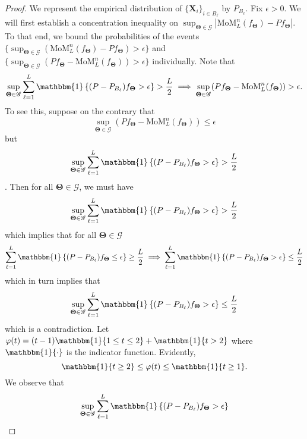 \documentclass{article}
\newcommand{\bX}{\boldsymbol{X}}
\newcommand{\bTheta}{\boldsymbol{\Theta}}
\newcommand{\cL}{\mathcal{L}}
\newcommand{\cO}{\mathcal{O}}
\newcommand{\one}{\mathbbm{1}}
\begin{document}
\begin{proof} 
We represent the empirical distribution of $\{\bX_i\}_{i \in B_\ell}$ by $P_{B_{\ell}}$. Fix $\epsilon>0$. We will first establish a concentration inequality on $\sup_{\bTheta \in \mathscr{G}} |\text{MoM}_L^n (f_{\bTheta}) - P f_{\bTheta} |$. To that end, we bound the probabilities of the events $\{\sup_{\bTheta \in \mathscr{G}}(\text{MoM}_L^n (f_{\bTheta}) - P f_{\bTheta}) >\epsilon\}$ and $\{\sup_{\bTheta \in \mathscr{G}}  ( P f_{\bTheta} - \text{MoM}_L^n (f_{\bTheta})) > \epsilon\}$ individually. Note that 
\begin{equation}
\sup_{\bTheta \in \mathscr{G}}\sum_{\ell = 1}^L \one\left\{(P-P_{B_\ell})f_{\bTheta} > \epsilon\right\} > \frac{L}{2} \implies \sup_{\bTheta \in \mathscr{G}} (P f_{\bTheta} - \text{MoM}_L^n (f_{\bTheta})) > \epsilon.
\end{equation}
To see this, suppose on the contrary that \[\sup_{\bTheta \in \mathscr{G}}  (P f_{\bTheta} - \text{MoM}_L^n (f_{\bTheta})) \le \epsilon\] but \[\sup_{\bTheta \in \mathscr{G}}\sum_{\ell = 1}^L \one\left\{(P-P_{B_\ell})f_{\bTheta} > \epsilon\right\} > \frac{L}{2}\]. 
Then for all $\bm{\Theta}\in \mathscr{G}$, we must have \[\sup_{\bTheta \in \mathscr{G}}\sum_{\ell = 1}^L \one\left\{(P-P_{B_\ell})f_{\bTheta} > \epsilon\right\} > \frac{L}{2}\] which implies that for all $\bm{\Theta}\in \mathscr{G}$ \[\sum_{\ell = 1}^L \one\left\{(P-P_{B_\ell})f_{\bTheta} \le \epsilon\right\} \ge \frac{L}{2} \implies \sum_{\ell = 1}^L \one\left\{(P-P_{B_\ell})f_{\bTheta} > \epsilon\right\} \le \frac{L}{2}\] which in turn implies that \[\sup_{\bTheta \in \mathscr{G}}\sum_{\ell = 1}^L \one\left\{(P-P_{B_\ell})f_{\bTheta} > \epsilon\right\} \le \frac{L}{2}\] which is a contradiction. Let $\varphi(t) = (t-1) \one\{1 \le t \le 2\} + \one\{t >2\}$ where $\one\{\cdot\}$ is the indicator function. Evidently,
\begin{equation}
    \label{eq6}
    \one\{t \ge 2\} \le \varphi(t) \le \one\{t \ge 1\}.
\end{equation} 
We observe that
\begingroup
\allowdisplaybreaks
\begin{align}
    \sup_{\bTheta \in \mathscr{G}}\sum_{\ell = 1}^L \one\left\{(P-P_{B_\ell})f_{\bTheta} > \epsilon\right\}

\end{align}
\end{proof}
\end{document}
